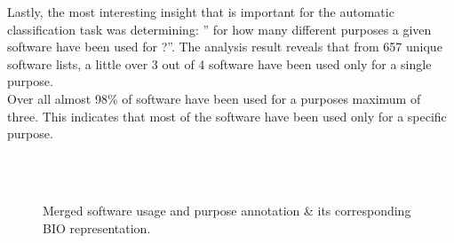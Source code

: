 Lastly, the most interesting insight that is important for the automatic classification task was determining: ” for how many different purposes a given software have been used for ?”.  The analysis result reveals that from 657 unique software lists, a little over 3 out of 4 software have been used only for a single purpose. \\

Over all almost 98\% of software have been used for a purposes maximum of three. This indicates that most of the software have been used only for a specific purpose.  


\begin{figure}[h]
	
	\myfloatalign
	
	 \\
	\\
	\caption[Subfloat - Figure]{Merged software usage and purpose annotation \& its corresponding BIO representation.}
\end{figure}


